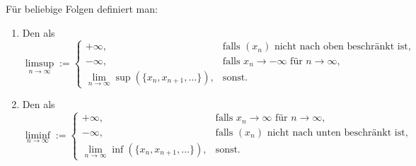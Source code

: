 Für beliebige Folgen definiert man:
\begin{enumerate}[label=\alph*)]
    \item Den  als $$\limsup_{n \to \infty} :=
    \begin{cases}
        + \infty, & \text{falls $(x_n)$ nicht nach oben beschränkt ist,} \\
        - \infty, & \text{falls $x_n \to -\infty$ für $n \to \infty$,} \\
        \lim_{n \to \infty}\sup(\{x_n, x_{n+1}, \dots\}), & \text{sonst.}
    \end{cases}$$
    \item Den  als $$\liminf_{n \to \infty} :=
    \begin{cases}
        + \infty, & \text{falls $x_n \to \infty$ für $n \to \infty$,} \\
        - \infty, & \text{falls $(x_n)$ nicht nach unten beschränkt ist,} \\
        \lim_{n \to \infty}\inf(\{x_n, x_{n+1}, \dots\}), & \text{sonst.}
    \end{cases}
    $$
\end{enumerate}